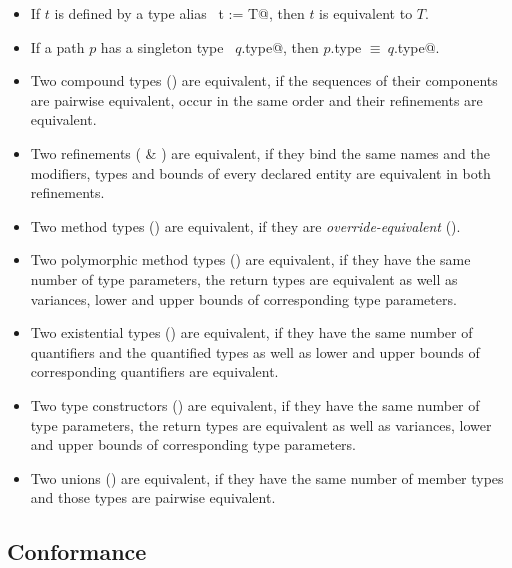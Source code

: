 \begin{itemize}
\item
If $t$ is defined by a type alias ~\lstinline@type t := T@, then $t$ is equivalent to $T$. 

\item
If a path $p$ has a singleton type ~\lstinline@$q$.type@, then \lstinline@$p$.type $\equiv\ q$.type@. 

\item
Two compound types () are equivalent, if the sequences of their components are pairwise equivalent, occur in the same order and their refinements are equivalent.

\item
Two refinements ( \& ) are equivalent, if they bind the same names and the modifiers, types and bounds of every declared entity are equivalent in both refinements. 

\item
Two method types () are equivalent, if they are {\em override-equivalent} ().

\item
Two polymorphic method types () are equivalent, if they have the same number of type parameters, the return types are equivalent as well as variances, lower and upper bounds of corresponding type parameters. 

\item
Two existential types () are equivalent, if they have the same number of quantifiers and the quantified types as well as lower and upper bounds of corresponding quantifiers are equivalent. 

\item
Two type constructors () are equivalent, if they have the same number of type parameters, the return types are equivalent as well as variances, lower and upper bounds of corresponding type parameters. 

\item 
Two unions () are equivalent, if they have the same number of member types and those types are pairwise equivalent. 

\end{itemize}






\subsection{Conformance}
\label{sec:conformance}

